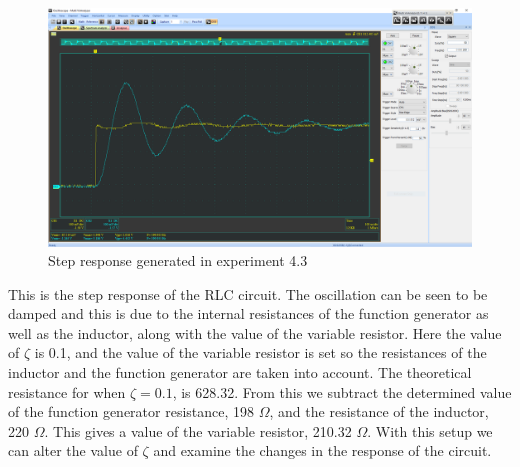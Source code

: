 \documentclass[12pt]{article}
\begin{document}
    \begin{figure}[h]
        \centering
        \includegraphics[width=\textwidth]{4.3.png}
        \caption{Step response generated in experiment 4.3}
    \end{figure}
    \par This is the step response of the RLC circuit. The oscillation can be seen to be damped and this is due to the internal resistances of the function generator as well as the inductor, along with the value of the variable resistor. Here the value of $ \zeta $ is 0.1, and the value of the variable resistor is set so the resistances of the inductor and the function generator are taken into account. The theoretical resistance for when $ \zeta = 0.1 $, is 628.32. From this we subtract the determined value of the function generator resistance, 198 $ \Omega $, and the resistance of the inductor, 220 $ \Omega $. This gives a value of the variable resistor, 210.32 $ \Omega $. With this setup we can alter the value of $ \zeta $ and examine the changes in the response of the circuit.
    \newpage
\end{document}
